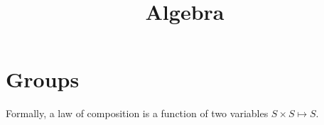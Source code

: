 \title{Algebra}

\section{Groups}

Formally, a law of composition is a function of two variables
$S\times S\mapsto S$.

